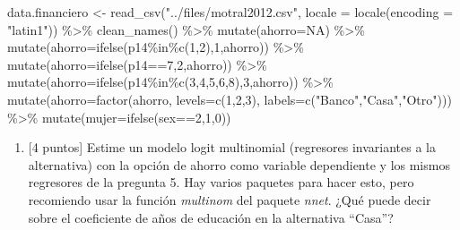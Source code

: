 \documentclass[
  letterpaper,
  DIV=11,
  numbers=noendperiod]{scrartcl}
\newenvironment{Shaded}{\begin{snugshade}}{\end{snugshade}}
\newcommand{\AttributeTok}[1]{\textcolor[rgb]{0.40,0.45,0.13}{#1}}
\newcommand{\ConstantTok}[1]{\textcolor[rgb]{0.56,0.35,0.01}{#1}}
\newcommand{\DecValTok}[1]{\textcolor[rgb]{0.68,0.00,0.00}{#1}}
\newcommand{\FunctionTok}[1]{\textcolor[rgb]{0.28,0.35,0.67}{#1}}
\newcommand{\NormalTok}[1]{\textcolor[rgb]{0.00,0.23,0.31}{#1}}
\newcommand{\OtherTok}[1]{\textcolor[rgb]{0.00,0.23,0.31}{#1}}
\newcommand{\SpecialCharTok}[1]{\textcolor[rgb]{0.37,0.37,0.37}{#1}}
\newcommand{\StringTok}[1]{\textcolor[rgb]{0.13,0.47,0.30}{#1}}
\providecommand{\tightlist}{%
  \setlength{\itemsep}{0pt}\setlength{\parskip}{0pt}}\usepackage{longtable,booktabs,array}
\begin{document}
\begin{Shaded}
\begin{Highlighting}[]
\NormalTok{data.financiero }\OtherTok{\textless{}{-}} \FunctionTok{read\_csv}\NormalTok{(}\StringTok{"../files/motral2012.csv"}\NormalTok{,}
                            \AttributeTok{locale =} \FunctionTok{locale}\NormalTok{(}\AttributeTok{encoding =} \StringTok{"latin1"}\NormalTok{)) }\SpecialCharTok{\%\textgreater{}\%}
  \FunctionTok{clean\_names}\NormalTok{() }\SpecialCharTok{\%\textgreater{}\%} 
  \FunctionTok{mutate}\NormalTok{(}\AttributeTok{ahorro=}\ConstantTok{NA}\NormalTok{) }\SpecialCharTok{\%\textgreater{}\%} 
  \FunctionTok{mutate}\NormalTok{(}\AttributeTok{ahorro=}\FunctionTok{ifelse}\NormalTok{(p14}\SpecialCharTok{\%in\%}\FunctionTok{c}\NormalTok{(}\DecValTok{1}\NormalTok{,}\DecValTok{2}\NormalTok{),}\DecValTok{1}\NormalTok{,ahorro)) }\SpecialCharTok{\%\textgreater{}\%}
  \FunctionTok{mutate}\NormalTok{(}\AttributeTok{ahorro=}\FunctionTok{ifelse}\NormalTok{(p14}\SpecialCharTok{==}\DecValTok{7}\NormalTok{,}\DecValTok{2}\NormalTok{,ahorro)) }\SpecialCharTok{\%\textgreater{}\%} 
  \FunctionTok{mutate}\NormalTok{(}\AttributeTok{ahorro=}\FunctionTok{ifelse}\NormalTok{(p14}\SpecialCharTok{\%in\%}\FunctionTok{c}\NormalTok{(}\DecValTok{3}\NormalTok{,}\DecValTok{4}\NormalTok{,}\DecValTok{5}\NormalTok{,}\DecValTok{6}\NormalTok{,}\DecValTok{8}\NormalTok{),}\DecValTok{3}\NormalTok{,ahorro)) }\SpecialCharTok{\%\textgreater{}\%} 
  \FunctionTok{mutate}\NormalTok{(}\AttributeTok{ahorro=}\FunctionTok{factor}\NormalTok{(ahorro,}
                   \AttributeTok{levels=}\FunctionTok{c}\NormalTok{(}\DecValTok{1}\NormalTok{,}\DecValTok{2}\NormalTok{,}\DecValTok{3}\NormalTok{), }\AttributeTok{labels=}\FunctionTok{c}\NormalTok{(}\StringTok{"Banco"}\NormalTok{,}\StringTok{"Casa"}\NormalTok{,}\StringTok{"Otro"}\NormalTok{))) }\SpecialCharTok{\%\textgreater{}\%}
  \FunctionTok{mutate}\NormalTok{(}\AttributeTok{mujer=}\FunctionTok{ifelse}\NormalTok{(sex}\SpecialCharTok{==}\DecValTok{2}\NormalTok{,}\DecValTok{1}\NormalTok{,}\DecValTok{0}\NormalTok{))}
\end{Highlighting}
\end{Shaded}

\begin{enumerate}
\def\labelenumi{\alph{enumi}.}
\tightlist
\item
  {[}4 puntos{]} Estime un modelo logit multinomial (regresores
  invariantes a la alternativa) con la opción de ahorro como variable
  dependiente y los mismos regresores de la pregunta 5. Hay varios
  paquetes para hacer esto, pero recomiendo usar la función
  \emph{multinom} del paquete \emph{nnet}. ¿Qué puede decir sobre el
  coeficiente de años de educación en la alternativa ``Casa''?
\end{enumerate}
\end{document}
